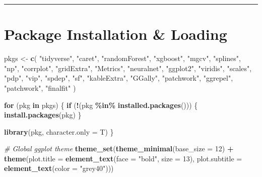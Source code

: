 \documentclass[
]{article}
\newenvironment{Shaded}{\begin{snugshade}}{\end{snugshade}}
\newcommand{\AttributeTok}[1]{\textcolor[rgb]{0.13,0.29,0.53}{#1}}
\newcommand{\CommentTok}[1]{\textcolor[rgb]{0.56,0.35,0.01}{\textit{#1}}}
\newcommand{\ControlFlowTok}[1]{\textcolor[rgb]{0.13,0.29,0.53}{\textbf{#1}}}
\newcommand{\DecValTok}[1]{\textcolor[rgb]{0.00,0.00,0.81}{#1}}
\newcommand{\FunctionTok}[1]{\textcolor[rgb]{0.13,0.29,0.53}{\textbf{#1}}}
\newcommand{\NormalTok}[1]{#1}
\newcommand{\OtherTok}[1]{\textcolor[rgb]{0.56,0.35,0.01}{#1}}
\newcommand{\SpecialCharTok}[1]{\textcolor[rgb]{0.81,0.36,0.00}{\textbf{#1}}}
\newcommand{\StringTok}[1]{\textcolor[rgb]{0.31,0.60,0.02}{#1}}
\begin{document}
\begin{center}\rule{0.5\linewidth}{0.5pt}\end{center}

\section{Package Installation \&
Loading}\label{package-installation-loading}

\begin{Shaded}
\begin{Highlighting}[]
\NormalTok{pkgs }\OtherTok{\textless{}{-}} \FunctionTok{c}\NormalTok{(}
  \StringTok{"tidyverse"}\NormalTok{, }\StringTok{"caret"}\NormalTok{, }\StringTok{"randomForest"}\NormalTok{, }\StringTok{"xgboost"}\NormalTok{, }\StringTok{"mgcv"}\NormalTok{, }\StringTok{"splines"}\NormalTok{, }\StringTok{"np"}\NormalTok{, }\StringTok{"corrplot"}\NormalTok{, }\StringTok{"gridExtra"}\NormalTok{,}
  \StringTok{"Metrics"}\NormalTok{, }\StringTok{"neuralnet"}\NormalTok{, }\StringTok{"ggplot2"}\NormalTok{, }\StringTok{"viridis"}\NormalTok{, }\StringTok{"scales"}\NormalTok{, }\StringTok{"pdp"}\NormalTok{, }\StringTok{"vip"}\NormalTok{, }\StringTok{"spdep"}\NormalTok{, }\StringTok{"sf"}\NormalTok{, }\StringTok{"kableExtra"}\NormalTok{,}
  \StringTok{"GGally"}\NormalTok{, }\StringTok{"patchwork"}\NormalTok{, }\StringTok{"ggrepel"}\NormalTok{, }\StringTok{"patchwork"}\NormalTok{, }\StringTok{"finalfit"}
\NormalTok{)}

\ControlFlowTok{for}\NormalTok{ (pkg }\ControlFlowTok{in}\NormalTok{ pkgs) \{}
  \ControlFlowTok{if}\NormalTok{ (}\SpecialCharTok{!}\NormalTok{(pkg }\SpecialCharTok{\%in\%} \FunctionTok{installed.packages}\NormalTok{())) \{}
    \FunctionTok{install.packages}\NormalTok{(pkg)}
\NormalTok{  \}}
  
  \FunctionTok{library}\NormalTok{(pkg, }\AttributeTok{character.only =}\NormalTok{ T)}
\NormalTok{\}}

\CommentTok{\# Global ggplot theme}
\FunctionTok{theme\_set}\NormalTok{(}\FunctionTok{theme\_minimal}\NormalTok{(}\AttributeTok{base\_size =} \DecValTok{12}\NormalTok{) }\SpecialCharTok{+}
            \FunctionTok{theme}\NormalTok{(}\AttributeTok{plot.title =} \FunctionTok{element\_text}\NormalTok{(}\AttributeTok{face =} \StringTok{"bold"}\NormalTok{, }\AttributeTok{size =} \DecValTok{13}\NormalTok{),}
                  \AttributeTok{plot.subtitle =} \FunctionTok{element\_text}\NormalTok{(}\AttributeTok{color =} \StringTok{"grey40"}\NormalTok{)))}
\end{Highlighting}
\end{Shaded}
\end{document}
